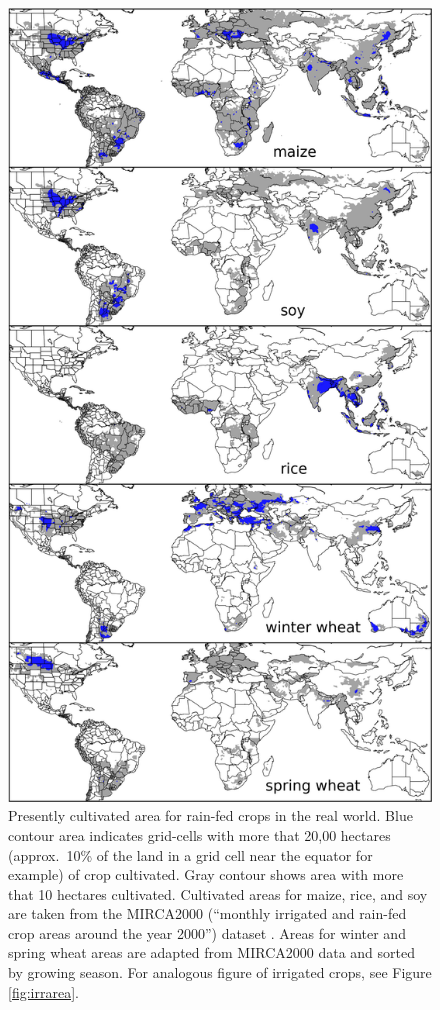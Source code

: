\documentclass[preprint, 5p, times, twocolumn]{elsarticle}
\begin{document}
\begin{figure}[!htb]
\centering
   \includegraphics[width=0.95\linewidth]{croparea.png}
   \caption{Presently cultivated area for rain-fed crops in the real world. Blue contour area indicates grid-cells with more that 20,00 hectares (approx.\ 10\% of the land in a grid cell near the equator for example) of crop cultivated. Gray contour shows area with more that 10 hectares cultivated. Cultivated areas for maize, rice, and soy are taken from the MIRCA2000 (``monthly irrigated and rain-fed crop areas around the year 2000'') dataset \citep{Portmann2010}. Areas for winter and spring wheat areas are adapted from MIRCA2000 data and sorted by growing season. For analogous figure of irrigated crops, see Figure \ref{fig:irrarea}.}
   \label{fig:crop_area}
\end{figure}
\end{document}
